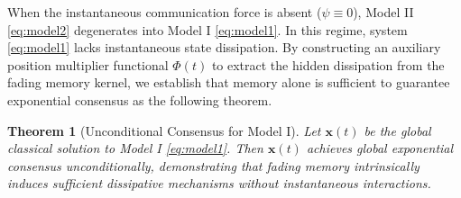 \documentclass[11pt]{amsart}
\newtheorem{theorem}{Theorem}[section]
\newtheorem{remark}{Remark}[section]
\numberwithin{equation}{section}
\begin{document}
When the instantaneous communication force is absent ($\psi \equiv 0$), Model II \eqref{eq:model2} degenerates into Model I \eqref{eq:model1}. In this regime, system \eqref{eq:model1} lacks instantaneous state dissipation. By constructing an auxiliary position multiplier functional $\Phi(t)$ to extract the hidden dissipation from the fading memory kernel, we establish that memory alone is sufficient to guarantee exponential consensus as the following theorem.

\begin{theorem}[Unconditional Consensus for Model I]\label{thm:model1}
Let $\boldsymbol{x}(t)$ be the global classical solution to Model I \eqref{eq:model1}. Then $\boldsymbol{x}(t)$ achieves global exponential consensus unconditionally, demonstrating that fading memory intrinsically induces sufficient dissipative mechanisms without instantaneous interactions.
\end{theorem}

%
\end{document}
